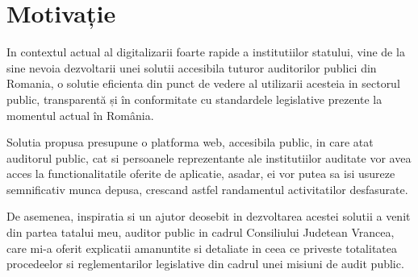 \chapter*{Motivație} 

In contextul actual al digitalizarii foarte rapide a institutiilor statului, vine de la sine nevoia 
dezvoltarii unei solutii accesibila tuturor auditorilor publici din Romania, o solutie eficienta din punct de vedere al utilizarii acesteia in sectorul public, transparentă și în conformitate cu standardele legislative prezente la momentul actual în România.
\par Solutia propusa presupune o platforma web, accesibila public, in care atat auditorul public, cat si persoanele reprezentante ale institutiilor auditate vor avea acces la functionalitatile oferite de aplicatie, asadar, ei vor putea sa isi usureze semnificativ munca depusa, crescand astfel randamentul activitatilor desfasurate.
\par De asemenea, inspiratia si un ajutor deosebit in dezvoltarea acestei solutii a venit din partea tatalui meu, auditor public in cadrul Consiliului Judetean Vrancea, care mi-a oferit explicatii amanuntite si detaliate in ceea ce priveste totalitatea procedeelor si reglementarilor legislative din cadrul unei misiuni de audit public.